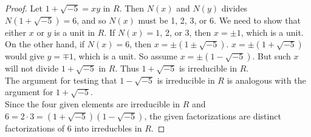 \documentclass{article}
\begin{document}
\begin{enumerate}[label={\bf(\alph*)}]
\begin{proof}
        Let $1+\sqrt{-5}=xy$ in $R$. Then $N(x)$ and $N(y)$ divides
        $N(1+\sqrt{-5})=6$, and so $N(x)$ must be 1, 2, 3, or 6. We need to
        show that either $x$ or $y$ is a unit in $R$. If $N(x)=1$, 2, or 3,
        then $x=\pm1$, which is a unit. On the other hand, if $N(x)=6$,
        then $x=\pm(1\pm\sqrt{-5})$. $x=\pm(1+\sqrt{-5})$ would give
        $y=\mp1$, which is a unit. So assume $x=\pm(1-\sqrt{-5})$. But such
        $x$ will not divide $1+\sqrt{-5}$ in $R$. Thus $1+\sqrt{-5}$ is
        irreducible in $R$. \\

        The argument for testing that $1-\sqrt{-5}$ is irreducible in $R$
        is analogous with the argument for $1+\sqrt{-5}$. \\

        Since the four given elements are irreducible in $R$ and
        $6=2\cdot3=(1+\sqrt{-5})(1-\sqrt{-5})$, the given factorizations
        are distinct factorizations of 6 into irreducbles in $R$.
      \end{proof}
  \end{enumerate}
\end{document}
